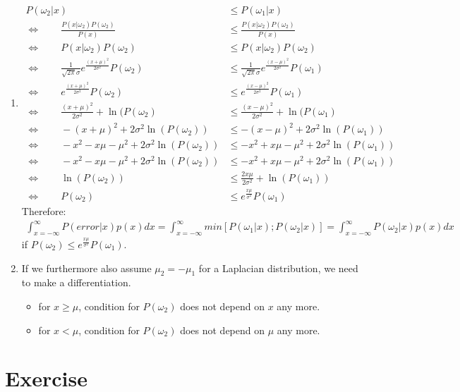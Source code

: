 \documentclass[a4paper]{article}
\begin{document}
		\begin{enumerate}[label={(\alph*)}]
		\item
			\begin{align*}
			P(\omega_2|x) &\leq P(\omega_1|x)\\
			\Leftrightarrow \qquad \frac{P(x|\omega_2)P(\omega_2)}{P(x)} &\leq \frac{P(x|\omega_2)P(\omega_2)}{P(x)}\\
			\Leftrightarrow \qquad P(x|\omega_2)P(\omega_2)&\leq P(x|\omega_2)P(\omega_2)\\
			\Leftrightarrow \qquad \frac{1}{\sqrt{2\pi}\sigma}e^{ \displaystyle\frac{(x+\mu)^2}{2\sigma^2}}P(\omega_2) &\leq \frac{1}{\sqrt{2\pi}\sigma}e^{\displaystyle \frac{(x-\mu)^2}{2\sigma^2}}P(\omega_1)\\
			\Leftrightarrow \qquad e^{\displaystyle\frac{(x+\mu)^2}{2\sigma^2}}P(\omega_2) &\leq e^{\displaystyle \frac{(x-\mu)^2}{2\sigma^2}}P(\omega_1)\\
			\Leftrightarrow \qquad \frac{(x+\mu)^2}{2\sigma^2} + \ln(P(\omega_2) &\leq \frac{(x-\mu)^2}{2\sigma^2} + \ln(P(\omega_1)\\
			\Leftrightarrow \qquad -(x+\mu)^2 + 2\sigma^2\ln(P(\omega_2)) &\leq -(x-\mu)^2 + 2\sigma^2\ln(P(\omega_1))\\
			\Leftrightarrow \qquad -x^2 -x\mu -\mu^2 + 2\sigma^2\ln(P(\omega_2)) &\leq -x^2+x\mu -\mu^2 + 2\sigma^2\ln(P(\omega_1))\\
			\Leftrightarrow \qquad -x^2 -x\mu -\mu^2 + 2\sigma^2\ln(P(\omega_2)) &\leq -x^2+x\mu -\mu^2 + 2\sigma^2\ln(P(\omega_1))\\
			\Leftrightarrow \qquad \ln(P(\omega_2)) &\leq \frac{2x\mu}{2\sigma^2}+\ln(P(\omega_1))\\
			\Leftrightarrow \qquad P(\omega_2) &\leq e^{\displaystyle \frac{x\mu}{\sigma^2}}P(\omega_1)
			\end{align*}
			Therefore:\\
			\begin{align*}
				\int_{x=-\infty}^\infty P(error|x)p(x)dx=\int_{x=-\infty}^\infty min[P(\omega_1|x); P(\omega_2|x)]=\int_{x=-\infty}^\infty P(\omega_2|x)p(x)dx
			\end{align*}
			if $P(\omega_2) \leq e^{\frac{x\mu}{\sigma^2}}P(\omega_1)$.
			\item If we furthermore also assume $\mu_2 = -\mu_1$ for a Laplacian distribution, we need to make a differentiation.
			\begin{itemize}
				\item for $x\geq \mu$, condition for $P(\omega_2)$ does not depend on $x$ any more.
				\item for $x < \mu$, condition for $P(\omega_2)$ does not depend on $\mu$ any more.
			\end{itemize}
		\end{enumerate}
	\section{Exercise}
\end{document}

